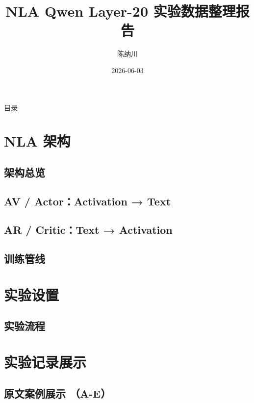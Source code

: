 \documentclass[fontset=fandol,aspectratio=169,11pt]{ctexbeamer}
\title[NLA Qwen L20 实验整理]{NLA Qwen Layer-20 实验数据整理报告}
\subtitle{}
\author{陈纳川}
\date{2026-06-03}
\begin{document}
\begin{frame}
  \titlepage
\end{frame}

\begin{frame}{目录}
  \tableofcontents[hideallsubsections]
\end{frame}

\section{NLA 架构}
\subsection{架构总览}

\subsection{AV / Actor：Activation → Text}

\subsection{AR / Critic：Text → Activation}

\subsection{训练管线}



\section{实验设置}
\subsection{实验流程}


\section{实验记录展示}


\subsection{原文案例展示 （A-E）}





\end{document}
